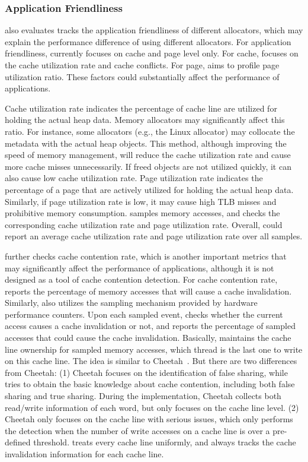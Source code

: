 \subsubsection{Application Friendliness} 
\MP{} also evaluates tracks the application friendliness of different allocators, which may explain the performance difference of using different allocators. For application friendliness, \MP{} currently focuses on cache and page level only. For cache, \MP{} focuses on the cache utilization rate and cache conflicts. For page, \MP{} aims to  profile page utilization ratio. These factors could substantially affect the performance of applications. 

Cache utilization rate indicates the percentage of cache line are utilized for holding the actual heap data. Memory allocators may significantly affect this ratio. For instance, some allocators (e.g., the Linux allocator) may collocate the metadata with the actual heap objects. This method, although improving the speed of memory management, will reduce the cache utilization rate and cause more cache misses unnecessarily. 
If freed objects are not utilized quickly, it can also cause low cache utilization rate. Page utilization rate indicates the percentage of a page that are actively utilized for holding the actual heap data. Similarly, if page utilization rate is low, it may cause high TLB misses and prohibitive memory consumption. \MP{} samples memory accesses, and checks the corresponding cache utilization rate and page utilization rate. Overall, \MP{} could report an average cache utilization rate and page utilization rate over all samples. 

\MP{} further checks cache contention rate, which is another important metrics that may significantly affect the performance of applications, although it is not designed as a tool of cache contention detection. For cache contention rate, \MP{} reports the percentage of memory accesses that will cause a cache invalidation.  Similarly, \MP{} also utilizes the sampling mechanism provided by hardware performance counters. Upon each sampled event, \MP{} checks whether the current access causes a cache invalidation or not, and reports the percentage of sampled accesses that could cause the cache invalidation. Basically, \MP{} maintains the cache line ownership for sampled memory accesses, which thread is the last one to write on this cache line. The idea is similar to Cheetah~\cite{Cheetah}. But there are two differences from Cheetah: (1) Cheetah focuses on the identification of false sharing, while \MP{} tries to obtain the basic knowledge about cache contention, including both false sharing and true sharing. During the implementation, Cheetah collects both read/write information of each word, but \MP{} only focuses on the cache line level. (2)  Cheetah only focuses on the cache line with serious issues, which only performs the detection when the number of write accesses on a cache line is over a pre-defined threshold. \MP{} treats every cache line uniformly, and always tracks the cache invalidation information for each cache line. 

